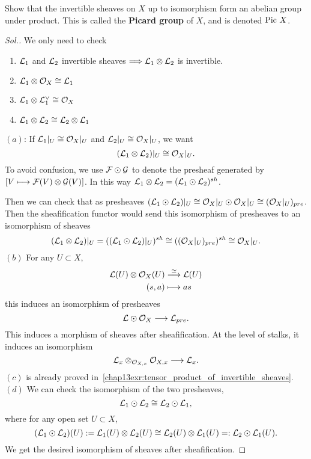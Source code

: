 \documentclass[11pt]{book} %
\begin{document}
\begin{exr}
Show that the invertible sheaves on $X$ up to isomorphism form an abelian group under product. This is called the \textbf{Picard group} of $X$, and is denoted $\text{Pic\ } X$. 
\end{exr}
\begin{proof}[Sol.]
We only need to check 
\begin{enumerate}[label=(\alph*)]
\item ${\cal L}_1$ and ${\cal L}_2$ invertible sheaves $\Longrightarrow {\cal L}_1\otimes{\cal L}_2$ is invertible.
\item ${\cal L}_1\otimes{\cal O}_X\cong {\cal L}_1$
\item ${\cal L}_1\otimes{\cal L}_1^\vee\cong {\cal O}_X$
\item ${\cal L}_1\otimes {\cal L}_2\cong{\cal L}_2\otimes{\cal L}_1$
\end{enumerate}
$(a)$: If ${\cal L}_1|_U\cong {\cal O}_X|_U$ and ${\cal L}_2|_U\cong{\cal O}_X|_U$, we want 
$$
({\cal L}_1\otimes{\cal L}_2)|_U \cong {\cal O}_X|_U.
$$
To avoid confusion, we use ${\cal F}\odot{\cal G}$ to denote the presheaf generated by $[V\longmapsto {\cal F}(V)\otimes{\cal G}(V)]$. In this way ${\cal L}_1\otimes{\cal L}_2=({\cal L}_1\odot{\cal L}_2)^{sh}$.

Then we can check that as presheaves $({\cal L}_1\odot{\cal L}_2)|_U\cong {\cal O}_X|_U\odot {\cal O}_X|_U\cong ({\cal O}_X|_U)_{pre}$. Then the sheafification functor would send this isomorphism of presheaves to an isomorphism of sheaves
$$
({\cal L}_1\otimes{\cal L}_2)|_U=(({\cal L}_1\odot{\cal L}_2)|_U)^{sh}\cong (({\cal O}_X|_U)_{pre})^{sh}\cong {\cal O}_X|_U.
$$
$(b)$ For any $U\subset X$,
 $$
 \begin{aligned}
 {\cal L}(U)\otimes{\cal O}_X(U)&\overset{\simeq}{\longrightarrow}{\cal L}(U)\\
 (s,a)&\longmapsto as
 \end{aligned}
 $$
 this induces an isomorphism of presheaves
 $$
 {\cal L}\odot {\cal O}_X\longrightarrow {\cal L}_{pre}.
 $$
 This induces a morphism of sheaves after sheafification. At the level of stalks,  it induces an isomorphism
 $$
{\cal L}_x\otimes_{{\cal O}_{X,x}}{\cal O}_{X,x}\longrightarrow{\cal L}_x.
 $$
 $(c)$ is already proved in~\ref{chap13exr:tensor_product_of_invertible_sheaves}.\\
$(d)$ We can check the isomorphism of the two presheaves, 
 $$
{\cal L}_1\odot {\cal L}_2 \cong {\cal L}_2\odot {\cal L}_1,
 $$
 where for any open  set $U\subset X$,
 $$
 ({\cal L}_1\odot {\cal L}_2) (U):={\cal L}_1(U)\otimes{\cal L}_2(U) \cong {\cal L}_2(U)\otimes{\cal L}_1(U)=:  {\cal L}_2\odot {\cal L}_1(U).
 $$
We get the desired isomorphism of sheaves after sheafification.

\end{proof}
\end{document}
